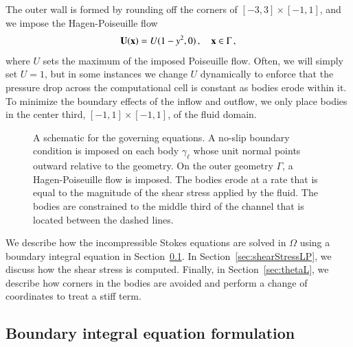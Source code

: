 \documentclass[preprint, 10pt]{elsarticle}
\begin{document}
The outer wall is formed by rounding off the corners of $[-3,3] \times [-1,1]$, and we impose the Hagen-Poiseuille flow
\begin{align}
  {\mathbf{U}}({\mathbf{x}}) = U (1-y^2,0)\, , \quad {\mathbf{x}} \in \Gamma\, ,
\end{align}
where $U$ sets the maximum of the imposed Poiseuille flow. Often, we will simply set $U=1$, but in some instances we change $U$ dynamically to enforce that the pressure drop across the computational cell is constant as bodies erode within it.  To minimize the boundary effects of the inflow and outflow, we only place bodies in the center third, $[-1,1] \times [-1,1]$, of the fluid domain.  
\begin{figure}[htpb]
  \centering
  
  \caption{\label{fig:schematic} A schematic for the governing equations.  A no-slip boundary condition is imposed on each body $\gamma_\ell$ whose unit normal points outward relative to the geometry.  On the outer geometry $\Gamma$, a Hagen-Poiseuille flow is imposed.  The bodies erode at a rate that is equal to the magnitude of the shear stress applied by the fluid.  The bodies are constrained to the middle third of the channel that is located between the dashed lines.}
\end{figure}

We describe how the incompressible Stokes equations are solved in $\Omega$ using a boundary integral equation in Section~\ref{sec:bies}.  In Section~\ref{sec:shearStressLP}, we discuss how the shear stress is computed.  Finally, in Section~\ref{sec:thetaL}, we describe how corners in the bodies are avoided and perform a change of coordinates to treat a stiff term.


\subsection{Boundary integral equation formulation} 
\label{sec:bies}
\end{document}
